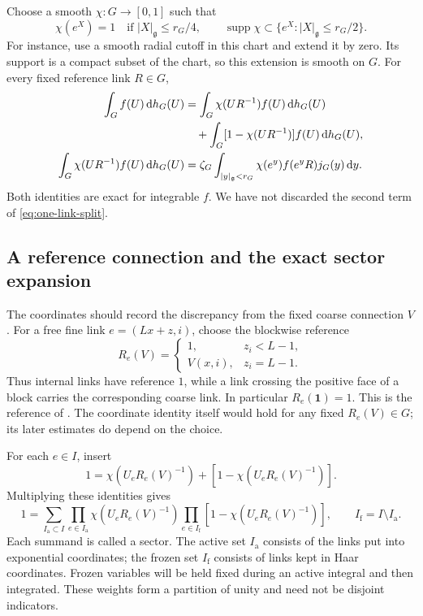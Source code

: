 \documentclass[11pt,reqno]{amsart}
\numberwithin{equation}{section}
\theoremstyle{definition}
\theoremstyle{remark}
\newcommand{\dd}{\mathrm d}
\newcommand{\g}{\mathfrak g}
\newcommand{\Ia}{I_{\mathrm a}}
\newcommand{\If}{I_{\mathrm f}}
\DeclareMathOperator{\supp}{supp}
\begin{document}
Choose a smooth \(\chi:G\to[0,1]\) such that
\begin{equation}
 \chi(e^X)=1\quad\text{if }|X|_{\g}\le r_G/4,
 \qquad
 \supp\chi\subset\{e^X:|X|_{\g}\le r_G/2\}.
 \label{eq:chart-cutoff}
\end{equation}
For instance, use a smooth radial cutoff in this chart and extend
it by zero. Its support is a compact subset of the chart, so this
extension is smooth on \(G\).
For every fixed reference link \(R\in G\),
\begin{align}
 \int_G f(U)\,\dd h_G(U)
 &=\int_G\chi(UR^{-1})f(U)\,\dd h_G(U)\notag\\
 &\quad+\int_G[1-\chi(UR^{-1})]f(U)\,\dd h_G(U),
 \label{eq:one-link-split}\\
 \int_G\chi(UR^{-1})f(U)\,\dd h_G(U)
 &=\zeta_G\int_{|y|_{\g}<r_G}
               \chi(e^y)f(e^yR)j_G(y)\,\dd y.
 \label{eq:one-link-chart}
\end{align}
Both identities are exact for integrable \(f\). We have not
discarded the second term of \eqref{eq:one-link-split}.

\subsection{A reference connection and the exact sector expansion}

The coordinates should record the discrepancy from the fixed coarse
connection \(V\). For a free fine link \(e=(Lx+z,i)\), choose the
blockwise reference
\begin{equation}
 R_e(V)=
 \begin{cases}
  1,&z_i<L-1,\\
  V(x,i),&z_i=L-1.
 \end{cases}
 \label{eq:reference-link}
\end{equation}
Thus internal links have reference \(1\), while a link crossing the
positive face of a block carries the corresponding coarse link.
In particular \(R_e(\mathbf1)=1\). This is the reference of
\cite[Section~11, just before (11.8), p.~38]{Main}.
The coordinate identity itself would hold for any fixed
\(R_e(V)\in G\); its later estimates do depend on the choice.

For each \(e\in I\), insert
\[
       1=\chi(U_eR_e(V)^{-1})+[1-\chi(U_eR_e(V)^{-1})].
\]
Multiplying these identities gives
\begin{equation}
 1=\sum_{\Ia\subset I}
       \prod_{e\in\Ia}\chi(U_eR_e(V)^{-1})
       \prod_{e\in\If}[1-\chi(U_eR_e(V)^{-1})],
 \qquad \If=I\setminus\Ia.
 \label{eq:sector-unity}
\end{equation}
Each summand is called a sector. The active set \(\Ia\) consists
of the links put into exponential coordinates; the frozen set
\(\If\) consists of links kept in Haar coordinates. Frozen variables
will be held fixed during an active integral and then integrated.
These weights form a partition of unity and need not be disjoint
indicators.
\end{document}
